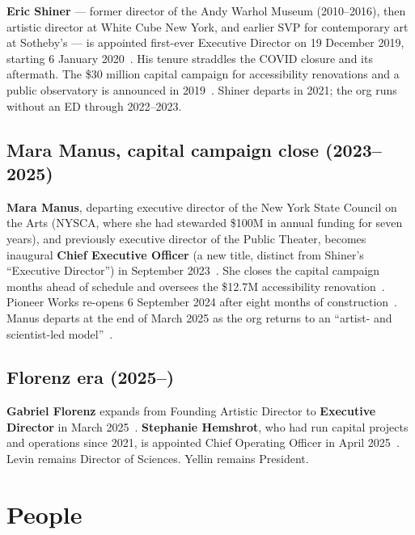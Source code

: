 \documentclass[10pt,letterpaper,twocolumn]{article}
\begin{document}
\textbf{Eric Shiner} --- former director of the Andy Warhol Museum (2010--2016), then artistic director at White Cube New York, and earlier SVP for contemporary art at Sotheby's --- is appointed first-ever Executive Director on 19 December 2019, starting 6 January 2020~\citep{prnewswire2019shiner}. His tenure straddles the COVID closure and its aftermath. The \$30 million capital campaign for accessibility renovations and a public observatory is announced in 2019~\citep{archpaper2024reopen}. Shiner departs in 2021; the org runs without an ED through 2022--2023.

\subsection{Mara Manus, capital campaign close (2023--2025)}

\textbf{Mara Manus}, departing executive director of the New York State Council on the Arts (NYSCA, where she had stewarded \$100M in annual funding for seven years), and previously executive director of the Public Theater, becomes inaugural \textbf{Chief Executive Officer} (a new title, distinct from Shiner's ``Executive Director'') in September 2023~\citep{artforum2023manus}. She closes the capital campaign months ahead of schedule and oversees the \$12.7M accessibility renovation~\citep{esd2025renovation}. Pioneer Works re-opens 6 September 2024 after eight months of construction~\citep{archpaper2024reopen}. Manus departs at the end of March 2025 as the org returns to an ``artist- and scientist-led model''~\citep{artforum2025stepsdown}.

\subsection{Florenz era (2025--)}

\textbf{Gabriel Florenz} expands from Founding Artistic Director to \textbf{Executive Director} in March 2025~\citep{artforum2025stepsdown}. \textbf{Stephanie Hemshrot}, who had run capital projects and operations since 2021, is appointed Chief Operating Officer in April 2025~\citep{artnews2025manus}. Levin remains Director of Sciences. Yellin remains President.

\section{People}
\end{document}
